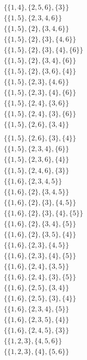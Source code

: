 \documentclass[11pt]{article}
\begin{document}
\begin{flushleft}
\begin{align*}
\{\{1, 4\}, \{2, 5, 6\}, \{3\}\}\\
\{\{1, 5\}, \{2, 3, 4, 6\}\}\\
\{\{1, 5\}, \{2\}, \{3, 4, 6\}\}\\
\{\{1, 5\}, \{2\}, \{3\}, \{4, 6\}\}\\
\{\{1, 5\}, \{2\}, \{3\}, \{4\}, \{6\}\}\\
\{\{1, 5\}, \{2\}, \{3, 4\}, \{6\}\}\\
\{\{1, 5\}, \{2\}, \{3, 6\}, \{4\}\}\\
\{\{1, 5\}, \{2, 3\}, \{4, 6\}\}\\
\{\{1, 5\}, \{2, 3\}, \{4\}, \{6\}\}\\
\{\{1, 5\}, \{2, 4\}, \{3, 6\}\}\\
\{\{1, 5\}, \{2, 4\}, \{3\}, \{6\}\}\\
\{\{1, 5\}, \{2, 6\}, \{3, 4\}\}\\
\end{align*}
\begin{align*}
\{\{1, 5\}, \{2, 6\}, \{3\}, \{4\}\}\\
\{\{1, 5\}, \{2, 3, 4\}, \{6\}\}\\
\{\{1, 5\}, \{2, 3, 6\}, \{4\}\}\\
\{\{1, 5\}, \{2, 4, 6\}, \{3\}\}\\
\{\{1, 6\}, \{2, 3, 4, 5\}\}\\
\{\{1, 6\}, \{2\}, \{3, 4, 5\}\}\\
\{\{1, 6\}, \{2\}, \{3\}, \{4, 5\}\}\\
\{\{1, 6\}, \{2\}, \{3\}, \{4\}, \{5\}\}\\
\{\{1, 6\}, \{2\}, \{3, 4\}, \{5\}\}\\
\{\{1, 6\}, \{2\}, \{3, 5\}, \{4\}\}\\
\{\{1, 6\}, \{2, 3\}, \{4, 5\}\}\\
\{\{1, 6\}, \{2, 3\}, \{4\}, \{5\}\}\\
\{\{1, 6\}, \{2, 4\}, \{3, 5\}\}\\
\{\{1, 6\}, \{2, 4\}, \{3\}, \{5\}\}\\
\{\{1, 6\}, \{2, 5\}, \{3, 4\}\}\\
\{\{1, 6\}, \{2, 5\}, \{3\}, \{4\}\}\\
\{\{1, 6\}, \{2, 3, 4\}, \{5\}\}\\
\{\{1, 6\}, \{2, 3, 5\}, \{4\}\}\\
\{\{1, 6\}, \{2, 4, 5\}, \{3\}\}\\
\{\{1, 2, 3\}, \{4, 5, 6\}\}\\
\{\{1, 2, 3\}, \{4\}, \{5, 6\}\}\\

\end{align*}
\end{flushleft}
\end{document}
